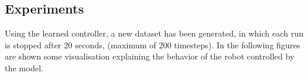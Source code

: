 \subsection{Experiments}

%
%
%


Using the learned controller, a new dataset has been generated, in which each run is stopped after 20 seconds, (maximum 
of 200 timesteps). 
In the following figures are shown some visualisation explaining the behavior of the robot controlled by the model.

